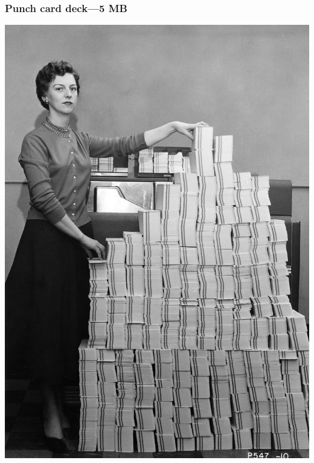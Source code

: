 \documentclass[11pt]{beamer}
\begin{document}

\begin{frame}[fragile]
  \frametitle{Punch card deck---5 MB}

  \includegraphics[height=0.75\textheight]{./img/file-structure-deck.png}
\end{frame}

\end{document}
